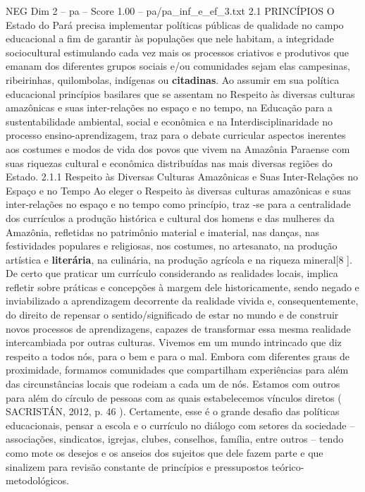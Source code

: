 \begin{textsample}{NEG Dim 2 – pa – Score 1.00 – pa/pa\_inf\_e\_ef\_3.txt}  \label{ex:f2_neg_224}
2.1 PRINCÍPIOS O Estado do Pará precisa implementar políticas públicas de qualidade no campo educacional a fim de garantir às populações que nele habitam, a integridade sociocultural estimulando cada vez mais os processos criativos e produtivos que emanam dos diferentes grupos sociais e/ou comunidades sejam elas campesinas, ribeirinhas, quilombolas, indígenas ou \textbf{citadinas}.
Ao assumir em sua política educacional princípios basilares que se assentam no Respeito às diversas culturas amazônicas e suas inter-relações no espaço e no tempo, na Educação para a sustentabilidade ambiental, social e econômica e na Interdisciplinaridade no processo ensino-aprendizagem, traz para o debate curricular aspectos inerentes aos costumes e modos de vida dos povos que vivem na Amazônia Paraense com suas riquezas cultural e econômica distribuídas nas mais diversas regiões do Estado. 2.1.1 Respeito às Diversas Culturas Amazônicas e Suas Inter-Relações no Espaço e no Tempo Ao eleger o Respeito às diversas culturas amazônicas e suas inter-relações no espaço e no tempo como princípio, traz -se para a centralidade dos currículos a produção histórica e cultural dos homens e das mulheres da Amazônia, refletidas no patrimônio material e imaterial, nas danças, nas festividades populares e religiosas, nos costumes, no artesanato, na produção artística e \textbf{literária}, na culinária, na produção agrícola e na riqueza mineral[8 ].
De certo que praticar um currículo considerando as realidades locais, implica refletir sobre práticas e concepções à margem dele historicamente, sendo negado e inviabilizado a aprendizagem decorrente da realidade vivida e, consequentemente, do direito de repensar o sentido/significado de estar no mundo e de construir novos processos de aprendizagens, capazes de transformar essa mesma realidade intercambiada por outras culturas.
Vivemos em um mundo intrincado que diz respeito a todos nós, para o bem e para o mal.
Embora com diferentes graus de proximidade, formamos comunidades que compartilham experiências para além das circunstâncias locais que rodeiam a cada um de nós.
Estamos com outros para além do círculo de pessoas com as quais estabelecemos vínculos diretos ( SACRISTÁN, 2012, p. 46 ).
Certamente, esse é o grande desafio das políticas educacionais, pensar a escola e o currículo no diálogo com setores da sociedade – associações, sindicatos, igrejas, clubes, conselhos, família, entre outros – tendo como mote os desejos e os anseios dos sujeitos que dele fazem parte e que sinalizem para revisão constante de princípios e pressupostos teórico-metodológicos.

\end{textsample}
